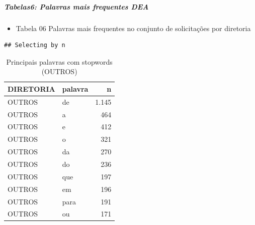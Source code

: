 \documentclass[]{article}
\newenvironment{Shaded}{\begin{snugshade}}{\end{snugshade}}
\newcommand{\KeywordTok}[1]{\textcolor[rgb]{0.13,0.29,0.53}{\textbf{#1}}}
\newcommand{\DataTypeTok}[1]{\textcolor[rgb]{0.13,0.29,0.53}{#1}}
\newcommand{\DecValTok}[1]{\textcolor[rgb]{0.00,0.00,0.81}{#1}}
\newcommand{\StringTok}[1]{\textcolor[rgb]{0.31,0.60,0.02}{#1}}
\newcommand{\OperatorTok}[1]{\textcolor[rgb]{0.81,0.36,0.00}{\textbf{#1}}}
\newcommand{\NormalTok}[1]{#1}
\providecommand{\tightlist}{%
  \setlength{\itemsep}{0pt}\setlength{\parskip}{0pt}}
\let\oldsubparagraph\subparagraph
\renewcommand{\subparagraph}[1]{\oldsubparagraph{#1}\mbox{}}
\begin{document}
\subparagraph{Tabelas6: Palavras mais frequentes
DEA}\label{tabelas6-palavras-mais-frequentes-dea}

\begin{itemize}
\tightlist
\item
  Tabela 06 Palavras mais frequentes no conjunto de solicitações por
  diretoria
\end{itemize}

\begin{Shaded}
\end{Shaded}

\begin{verbatim}
## Selecting by n
\end{verbatim}

\begin{table}[!h]

\caption{\label{tab:unnamed-chunk-24}Principais palavras com stopwords (OUTROS)}
\centering
\begin{tabular}{llr}
\toprule
DIRETORIA & palavra & n\\
\midrule
\rowcolor{gray!6}  OUTROS & de & 1.145\\
OUTROS & a & 464\\
\rowcolor{gray!6}  OUTROS & e & 412\\
OUTROS & o & 321\\
\rowcolor{gray!6}  OUTROS & da & 270\\
\addlinespace
OUTROS & do & 236\\
\rowcolor{gray!6}  OUTROS & que & 197\\
OUTROS & em & 196\\
\rowcolor{gray!6}  OUTROS & para & 191\\
OUTROS & ou & 171\\
\bottomrule
\end{tabular}
\end{table}
\end{document}
